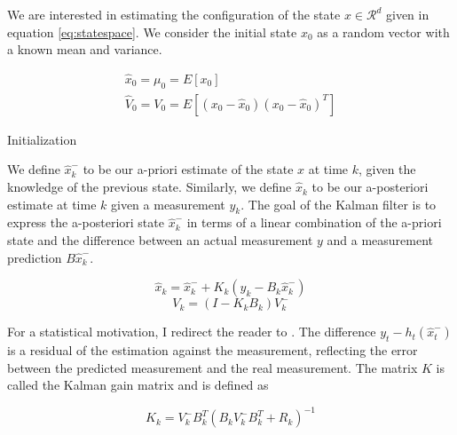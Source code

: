 \documentclass[mscthesis]{usiinfthesis}
\begin{document}


We are interested in estimating the configuration of the state $x \in \mathcal{R}^d$ given in equation \ref{eq:statespace}. We consider the initial state $x_0$ as a random vector with a known mean and variance.

\begin{eqfloat}
\begin{equation}
\begin{array}{l}
\hat{x}_0 = \mu_0 = E[x_0] \\
\hat{V}_0 = V_0 = E[(x_0-\hat{x}_0)(x_0-\hat{x}_0)^T] 
\end{array}
\label{eq:linear_kalman_init}
\end{equation}
\caption{Initialization}
\end{eqfloat}


We define $\hat{x}_k^-$ to be our a-priori estimate of the state $x$ at time $k$, given the knowledge of the previous state. Similarly, we define $\hat{x}_k$ to be our a-posteriori estimate at time $k$ given a measurement $y_k$. The goal of the Kalman filter is to express the a-posteriori state $\hat{x}_k^-$ in terms of a linear combination of the a-priori state and the difference between an actual measurement $y$ and a measurement prediction $B \hat{x}_k^-$. 



\[
\hat{x}_k = \hat{x}_k^- + K_k (y_k - B_k \hat{x}_k^-)
\]
\[
V_k = (I-K_k B_k)V_k^-
\]



For a statistical motivation, I redirect the reader to \citet{paper:Maybeck79}. The difference $y_t - h_t(\hat{x}_t^-)$ is a residual of the estimation against the measurement, reflecting the error between the predicted measurement and the real measurement. The matrix $K$ is called the Kalman gain matrix and is defined as 


\[
K_k = V_k^- B^T_k (B_k V_k^- B^T_k + R_k)^{-1}
\]


\end{document}
